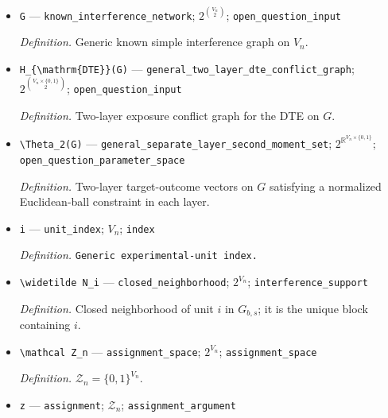 \documentclass{article}
\begin{document}
\begin{itemize}
  \par\smallskip\noindent\emph{Definition.} Disjoint union of the complete graphs induced by the blocks in \(\mathcal B_{b,s}\).
  \item \texttt{G} --- \texttt{known\_\allowbreak{}interference\_\allowbreak{}network}; \(2^{\binom{V_n}{2}}\); \texttt{open\_\allowbreak{}question\_\allowbreak{}input}
  \par\smallskip\noindent\emph{Definition.} Generic known simple interference graph on \(V_n\).
  \item \texttt{H\_\allowbreak{}\{\textbackslash{}\allowbreak{}mathrm\{DTE\}\allowbreak{}\}\allowbreak{}(G)} --- \texttt{general\_\allowbreak{}two\_\allowbreak{}layer\_\allowbreak{}dte\_\allowbreak{}conflict\_\allowbreak{}graph}; \(2^{\binom{V_n\times\{0,1\}}{2}}\); \texttt{open\_\allowbreak{}question\_\allowbreak{}input}
  \par\smallskip\noindent\emph{Definition.} Two-layer exposure conflict graph for the DTE on \(G\).
  \item \texttt{\textbackslash{}\allowbreak{}Theta\_\allowbreak{}2(G)} --- \texttt{general\_\allowbreak{}separate\_\allowbreak{}layer\_\allowbreak{}second\_\allowbreak{}moment\_\allowbreak{}set}; \(2^{\mathbb R^{V_n\times\{0,1\}}}\); \texttt{open\_\allowbreak{}question\_\allowbreak{}parameter\_\allowbreak{}space}
  \par\smallskip\noindent\emph{Definition.} Two-layer target-outcome vectors on \(G\) satisfying a normalized Euclidean-ball constraint in each layer.
  \item \texttt{i} --- \texttt{unit\_\allowbreak{}index}; \(V_n\); \texttt{index}
  \par\smallskip\noindent\emph{Definition.} \texttt{Generic experimental-\allowbreak{}unit index.}
  \item \texttt{\textbackslash{}\allowbreak{}widetilde N\_\allowbreak{}i} --- \texttt{closed\_\allowbreak{}neighborhood}; \(2^{V_n}\); \texttt{interference\_\allowbreak{}support}
  \par\smallskip\noindent\emph{Definition.} Closed neighborhood of unit \(i\) in \(G_{b,s}\); it is the unique block containing \(i\).
  \item \texttt{\textbackslash{}\allowbreak{}mathcal Z\_\allowbreak{}n} --- \texttt{assignment\_\allowbreak{}space}; \(2^{V_n}\); \texttt{assignment\_\allowbreak{}space}
  \par\smallskip\noindent\emph{Definition.} \(\mathcal Z_n=\{0,1\}^{V_n}\).
  \item \texttt{z} --- \texttt{assignment}; \(\mathcal Z_n\); \texttt{assignment\_\allowbreak{}argument}

\end{itemize}
\end{document}

